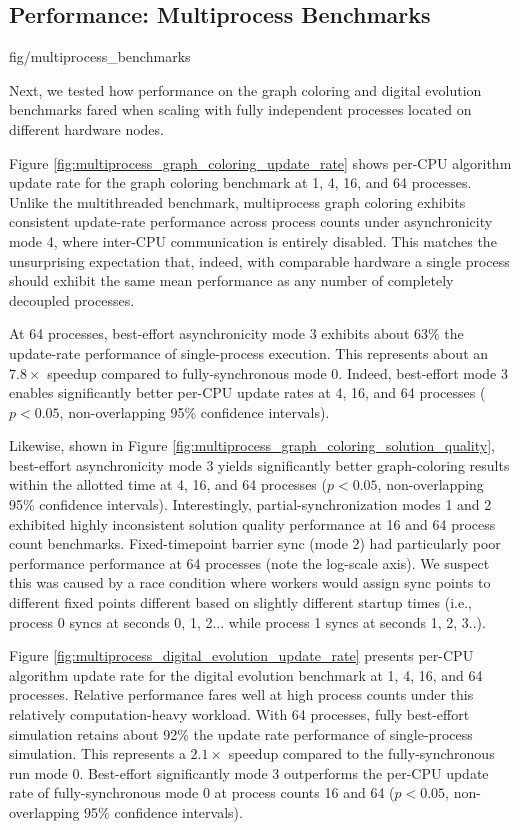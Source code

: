 \subsection{Performance: Multiprocess Benchmarks}
\label{sec:multiprocess-benchmarks}

{fig/multiprocess_benchmarks}

Next, we tested how performance on the graph coloring and digital evolution benchmarks fared when scaling with fully independent processes located on different hardware nodes.

Figure \ref{fig:multiprocess_graph_coloring_update_rate} shows per-CPU algorithm update rate for the graph coloring benchmark at 1, 4, 16, and 64 processes.
Unlike the multithreaded benchmark, multiprocess graph coloring exhibits consistent update-rate performance across process counts under asynchronicity mode 4, where inter-CPU communication is entirely disabled.
This matches the unsurprising expectation that, indeed, with comparable hardware a single process should exhibit the same mean performance as any number of completely decoupled processes.

At 64 processes, best-effort asynchronicity mode 3 exhibits about 63\% the update-rate performance of single-process execution.
This represents about an $7.8\times$ speedup compared to fully-synchronous mode 0.
Indeed, best-effort mode 3 enables significantly better per-CPU update rates at 4, 16, and 64 processes ($p < 0.05$, non-overlapping 95\% confidence intervals).

Likewise, shown in Figure \ref{fig:multiprocess_graph_coloring_solution_quality}, best-effort asynchronicity mode 3 yields significantly better graph-coloring results within the allotted time at 4, 16, and 64 processes ($p < 0.05$, non-overlapping 95\% confidence intervals).
Interestingly, partial-synchronization modes 1 and 2 exhibited highly inconsistent solution quality performance at 16 and 64 process count benchmarks.
Fixed-timepoint barrier sync (mode 2) had particularly poor performance performance at 64 processes (note the log-scale axis).
We suspect this was caused by a race condition where workers would assign sync points to different fixed points different based on slightly different startup times (i.e., process 0 syncs at seconds 0, 1, 2... while process 1 syncs at seconds 1, 2, 3..).

Figure \ref{fig:multiprocess_digital_evolution_update_rate} presents per-CPU algorithm update rate for the digital evolution benchmark at 1, 4, 16, and 64 processes.
Relative performance fares well at high process counts under this relatively computation-heavy workload.
With 64 processes, fully best-effort simulation retains about 92\% the update rate performance of single-process simulation.
This represents a $2.1\times$ speedup compared to the fully-synchronous run mode 0.
Best-effort significantly mode 3 outperforms the per-CPU update rate of fully-synchronous mode 0 at process counts 16 and 64 ($p < 0.05$, non-overlapping 95\% confidence intervals).
